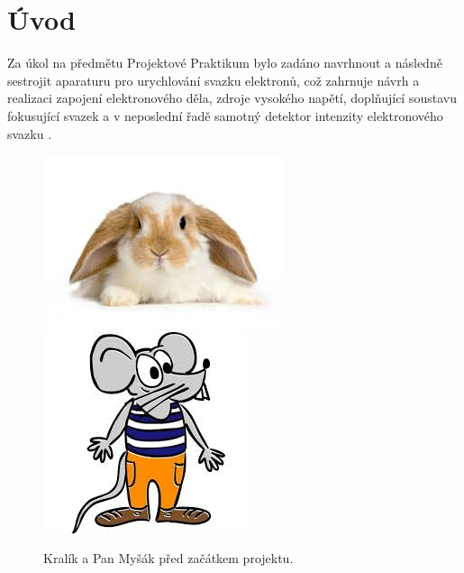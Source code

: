 \newpage
\chapter*{Úvod} %


Za úkol na předmětu Projektové Praktikum bylo zadáno navrhnout a následně sestrojit aparaturu pro urychlování svazku elektronů, což zahrnuje návrh a realizaci zapojení elektronového děla, zdroje vysokého napětí, doplňující soustavu fokusující svazek a v neposlední řadě samotný detektor intenzity elektronového svazku \cite{PanMysak, Kralik}.   

\begin{figure}[htbp!]
\centering
\includegraphics[width = 170 pt]{Figure/kralik.jpeg}
\hfill
\includegraphics[scale = 0.5]{Figure/mysak.jpeg}
 \caption{Kralík a Pan Myšák před začátkem projektu.}
\label{02ukazka}
\end{figure}



